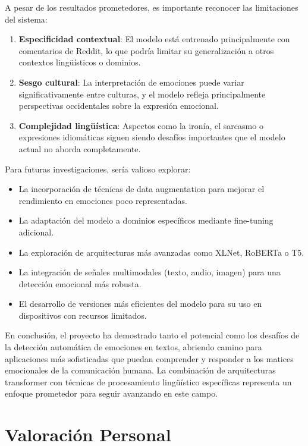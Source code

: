 \documentclass[12pt,a4paper]{report}
\begin{document}
A pesar de los resultados prometedores, es importante reconocer las limitaciones del sistema:

\begin{enumerate}
  \item \textbf{Especificidad contextual}: El modelo está entrenado principalmente con comentarios de Reddit, lo que podría limitar su generalización a otros contextos lingüísticos o dominios.

  \item \textbf{Sesgo cultural}: La interpretación de emociones puede variar significativamente entre culturas, y el modelo refleja principalmente perspectivas occidentales sobre la expresión emocional.

  \item \textbf{Complejidad lingüística}: Aspectos como la ironía, el sarcasmo o expresiones idiomáticas siguen siendo desafíos importantes que el modelo actual no aborda completamente.
\end{enumerate}

Para futuras investigaciones, sería valioso explorar:

\begin{itemize}
  \item La incorporación de técnicas de data augmentation para mejorar el rendimiento en emociones poco representadas.
  \item La adaptación del modelo a dominios específicos mediante fine-tuning adicional.
  \item La exploración de arquitecturas más avanzadas como XLNet, RoBERTa o T5.
  \item La integración de señales multimodales (texto, audio, imagen) para una detección emocional más robusta.
  \item El desarrollo de versiones más eficientes del modelo para su uso en dispositivos con recursos limitados.
\end{itemize}

En conclusión, el proyecto ha demostrado tanto el potencial como los desafíos de la detección automática de emociones en textos, abriendo camino para aplicaciones más sofisticadas que puedan comprender y responder a los matices emocionales de la comunicación humana. La combinación de arquitecturas transformer con técnicas de procesamiento lingüístico específicas representa un enfoque prometedor para seguir avanzando en este campo.

\chapter{Valoración Personal}
\end{document}
